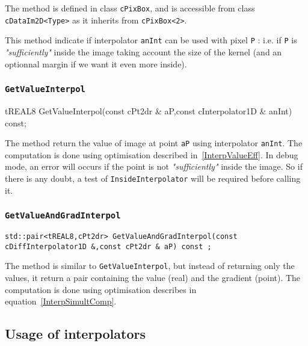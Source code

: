 The method is defined in class {\tt cPixBox}, and is accessible from class  {\tt cDataIm2D<Type>}
as it inherits from {\tt cPixBox<2>}.

This method indicate if  interpolator {\tt anInt} can be used with pixel {\tt P} : i.e. if {\tt P}
is \emph{"sufficiently"} inside the image taking account the size of the kernel (and an optionnal
margin if we want it even more inside).


\subsubsection{{\tt GetValueInterpol}}

{tREAL8 GetValueInterpol(const cPt2dr \& aP,const cInterpolator1D \& anInt) const;}

The method return the value of image at point {\tt aP} using interpolator {\tt anInt}. 
The computation is done using optimisation described in~\ref{InterpValueEff}.
In debug mode, an error will occurs if the point is not \emph{"sufficiently"} inside 
the image. So if there is any doubt, a test of {\tt InsideInterpolator} will be required before calling it.


\subsubsection{{\tt GetValueAndGradInterpol}}

\label{Method:GetValueAndGradInterpol}

{\tt std::pair<tREAL8,cPt2dr> GetValueAndGradInterpol(const cDiffInterpolator1D \&,const cPt2dr \& aP) const ;}

The method is similar to {\tt GetValueInterpol}, but instead of returning only the values, it 
return a pair containing the value (real) and the gradient (point).
The computation is done using optimisation describes in equation~\ref{InterpSimultComp}.



\subsection{Usage of interpolators}


